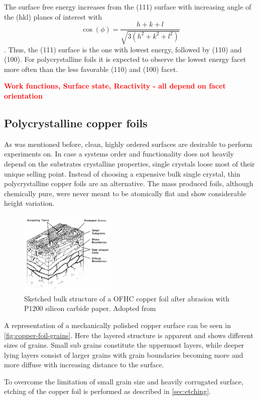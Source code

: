 The surface free energy increases from the (111) surface with increasing angle of the (hkl) planes of interest with $$\cos(\phi)=\frac{h+k+l}{\sqrt{3(h^2+k^2+l^2)}}$$ \cite{jian-min_calculation_2004}. Thus, the (111) surface is the one with lowest energy, followed by (110) and (100). For polycrystalline foils it is expected to observe the lowest energy facet more often than the less favorable (110) and (100) facet.

\textcolor{red}{\textbf{Work functions, Surface state, Reactivity - all depend on facet orientation}}

 \subsection{Polycrystalline copper foils}
 
  As was mentioned before, clean, highly ordered surfaces are desirable to perform experiments on. In case a systems order and functionality does not heavily depend on the substrates crystalline properties, single crystals loose most of their unique selling point. Instead of choosing a expensive bulk single crystal, thin polycrystalline copper foils are an alternative. The mass produced foils, although chemically pure, were never meant to be atomically flat and show considerable height variation.

\begin{figure}\centering
	\includegraphics[height=40mm]{./images/grain-structure-copper-foil}
	\caption{Sketched bulk structure of a OFHC copper foil after abrasion with P1200 silicon carbide paper. Adopted from \cite{turley_nature_1981}}
	\label{fig:copper-foil-grains}
\end{figure}

 A representation of a mechanically polished copper surface can be seen in \autoref{fig:copper-foil-grains}. Here the layered structure is apparent and shows different sizes of grains. Small sub grains constitute the uppermost layers, while deeper lying layers consist of larger grains with grain boundaries becoming more and more diffuse with increasing distance to the surface. 
 
To overcome the limitation of small grain size and heavily corrugated surface, etching of the copper foil is performed as described in \autoref{sec:etching}.